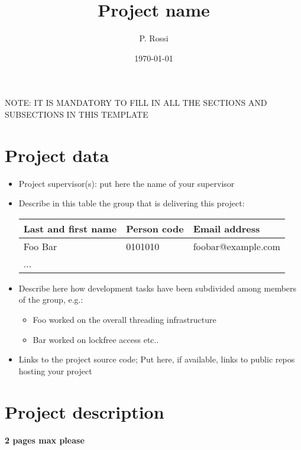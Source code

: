 \documentclass[10pt,a4]{article}
\author{P. Rossi}
\date{\today}
\title{Project name}
\begin{document}
\maketitle
\tableofcontents

\begin{center}
NOTE: IT IS MANDATORY TO FILL IN ALL THE SECTIONS AND SUBSECTIONS IN THIS TEMPLATE
\end{center}

\section{Project data}

\begin{itemize}
\item 
  Project supervisor(s): put here the name of your supervisor

\item 
Describe in this table the group that is delivering this project:

\begin{center}
\begin{tabular}{lll}
Last and first name & Person code & Email address\\
\hline
  Foo Bar & 0101010 & foobar@example.com \\
  ... & &                     
\end{tabular}
\end{center}

\item
Describe here how development tasks have been subdivided among members
of the group, e.g.:

\begin{itemize}
\item Foo worked on the overall threading infrastructure
\item Bar worked on lockfree access etc..
\end{itemize}

\item Links to the project source code; Put here, if available, links to public repos hosting your project 

\end{itemize}


\section{Project description}

\textbf{2 pages max please}
\end{document}
